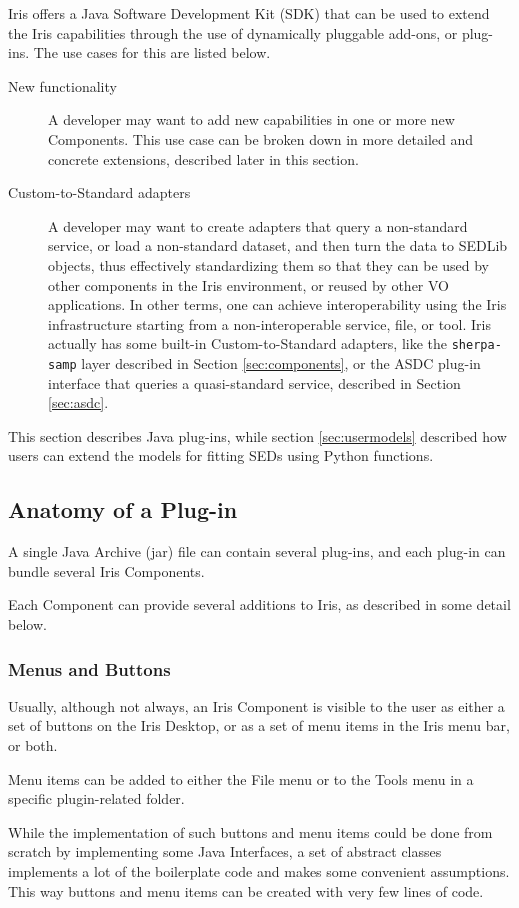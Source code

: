 \documentclass[preprint,authoryear,5p]{elsarticle}
\begin{document}
Iris offers a Java Software Development Kit (SDK) that can be used to extend the Iris
capabilities through the use of dynamically pluggable add-ons, or plug-ins.  The
use cases for this are listed below.
\begin{description} \item[New
functionality] A developer may want to add new capabilities in one or
more new Components. This use case can be broken down in more detailed and
concrete extensions, described later in this section.  \item[Custom-to-Standard
adapters] A developer may want to create adapters that query a non-standard
service, or load a non-standard dataset, and then turn the data to SEDLib
objects, thus effectively standardizing them so that they can be used by other
components in the Iris environment, or reused by other VO applications. In other
terms, one can achieve interoperability using the Iris infrastructure starting
from a non-interoperable service, file, or tool. Iris actually has some built-in
Custom-to-Standard adapters, like the \verb|sherpa-samp| layer described in Section
\ref{sec:components}, or the ASDC plug-in interface that queries a
quasi-standard service, described in Section \ref{sec:asdc}.  \end{description}

This section describes Java plug-ins, while section \ref{sec:usermodels} described how
users can extend the models for fitting SEDs using Python functions.

\subsection{Anatomy of a Plug-in} A single Java Archive (jar) file can contain several
plug-ins, and each plug-in can bundle several Iris Components.

Each Component can provide several additions to Iris, as described in some
detail below.

\subsubsection{Menus and Buttons} Usually, although not always, an Iris
Component is visible to the user as either a set of buttons on the Iris Desktop,
or as a set of menu items in the Iris menu bar, or both.

Menu items can be added to either the File menu or to the Tools menu in a
specific plugin-related folder.

While the implementation of such buttons and menu items could be done from
scratch by implementing some Java Interfaces, a set of abstract classes
implements a lot of the boilerplate code and makes some convenient assumptions.
This way buttons and menu items can be created with very few lines of code.
\end{document}
